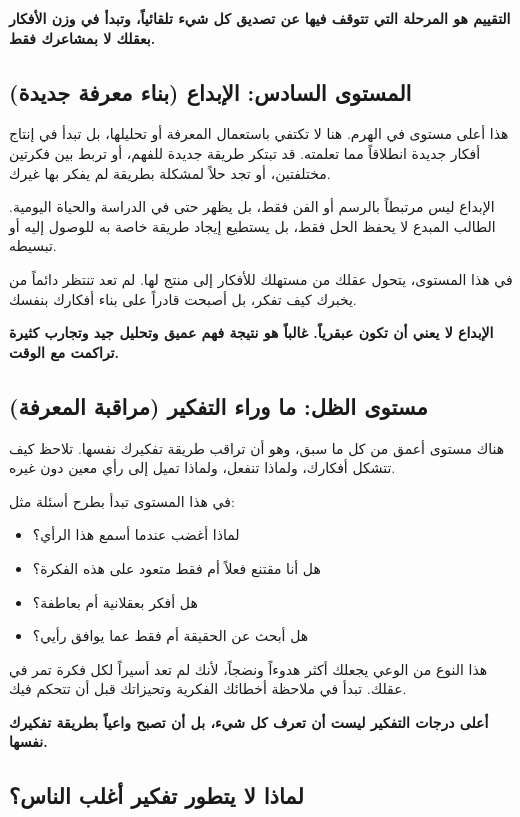 \documentclass[12pt,a4paper]{book}
\newcommand{\importantAr}[1]{%
	\begin{important}
		\bfseries #1
	\end{important}
}
\begin{document}
	\importantAr{
		التقييم هو المرحلة التي تتوقف فيها عن تصديق كل شيء تلقائياً، وتبدأ في وزن الأفكار بعقلك لا بمشاعرك فقط.
	}
	
	\subsection{المستوى السادس: الإبداع (بناء معرفة جديدة)}
	
	هذا أعلى مستوى في الهرم. هنا لا تكتفي باستعمال المعرفة أو تحليلها، بل تبدأ في إنتاج أفكار جديدة انطلاقاً مما تعلمته. قد تبتكر طريقة جديدة للفهم، أو تربط بين فكرتين مختلفتين، أو تجد حلاً لمشكلة بطريقة لم يفكر بها غيرك.
	
	الإبداع ليس مرتبطاً بالرسم أو الفن فقط، بل يظهر حتى في الدراسة والحياة اليومية. الطالب المبدع لا يحفظ الحل فقط، بل يستطيع إيجاد طريقة خاصة به للوصول إليه أو تبسيطه.
	
	في هذا المستوى، يتحول عقلك من مستهلك للأفكار إلى منتج لها. لم تعد تنتظر دائماً من يخبرك كيف تفكر، بل أصبحت قادراً على بناء أفكارك بنفسك.
	
	\importantAr{
		الإبداع لا يعني أن تكون عبقرياً. غالباً هو نتيجة فهم عميق وتحليل جيد وتجارب كثيرة تراكمت مع الوقت.
	}
	
	\subsection{مستوى الظل: ما وراء التفكير (مراقبة المعرفة)}
	
	هناك مستوى أعمق من كل ما سبق، وهو أن تراقب طريقة تفكيرك نفسها. تلاحظ كيف تتشكل أفكارك، ولماذا تنفعل، ولماذا تميل إلى رأي معين دون غيره.
	
	في هذا المستوى تبدأ بطرح أسئلة مثل:
	\begin{itemize}
		\item لماذا أغضب عندما أسمع هذا الرأي؟
		\item هل أنا مقتنع فعلاً أم فقط متعود على هذه الفكرة؟
		\item هل أفكر بعقلانية أم بعاطفة؟
		\item هل أبحث عن الحقيقة أم فقط عما يوافق رأيي؟
	\end{itemize}
	
	هذا النوع من الوعي يجعلك أكثر هدوءاً ونضجاً، لأنك لم تعد أسيراً لكل فكرة تمر في عقلك. تبدأ في ملاحظة أخطائك الفكرية وتحيزاتك قبل أن تتحكم فيك.
	
	\importantAr{
		أعلى درجات التفكير ليست أن تعرف كل شيء، بل أن تصبح واعياً بطريقة تفكيرك نفسها.
	}
	
\subsection{لماذا لا يتطور تفكير أغلب الناس؟}
	
\end{document}
